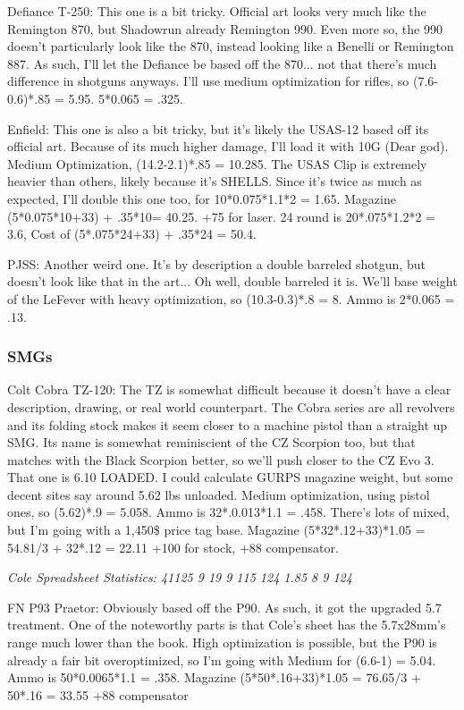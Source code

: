 \begin{multicols*}{2}
	Defiance T-250: This one is a bit tricky. Official art looks very much like the Remington 870, but Shadowrun already Remington 990. Even more so, the 990 doesn't particularly look like the 870, instead looking like a Benelli or Remington 887. As such, I'll let the Defiance be based off the 870... not that there's much difference in shotguns anyways. I'll use medium optimization for rifles, so (7.6-0.6)*.85 = 5.95. 5*0.065 = .325.
	
	Enfield: This one is also a bit tricky, but it's likely the USAS-12 based off its official art. Because of its much higher damage, I'll load it with 10G (Dear god). Medium Optimization, (14.2-2.1)*.85 = 10.285. The USAS Clip is extremely heavier than others, likely because it's SHELLS. Since it's twice as much as expected, I'll double this one too, for 10*0.075*1.1*2 = 1.65. Magazine (5*0.075*10+33) + .35*10= 40.25. +75 for laser. 24 round is 20*.075*1.2*2 = 3.6, Cost of (5*.075*24+33) + .35*24 = 50.4.
	
	PJSS: Another weird one. It's by description a double barreled shotgun, but doesn't look like that in the art... Oh well, double barreled it is. We'll base weight of the LeFever with heavy optimization, so (10.3-0.3)*.8 = 8. Ammo is  2*0.065 = .13.
	
	\subsubsection{SMGs}
	
	Colt Cobra TZ-120: The TZ is somewhat difficult because it doesn't have a clear description, drawing, or real world counterpart. The Cobra series are all revolvers and its folding stock makes it seem closer to a machine pistol than a straight up SMG. Its name is somewhat reminiscient of the CZ Scorpion too, but that matches with the Black Scorpion better, so we'll push closer to the CZ Evo 3. That one is 6.10 LOADED. I could calculate GURPS magazine weight, but some decent sites say around 5.62 lbs unloaded. Medium optimization, using pistol ones, so (5.62)*.9 = 5.058. Ammo is 32*.0.013*1.1 = .458. There's lots of mixed, but I'm going with a 1,450\$ price tag base. Magazine (5*32*.12+33)*1.05 = 54.81/3 + 32*.12 = 22.11 +100 for stock, +88 compensator.
	
	\textit{\textcolor{OliveGreen}{Cole Spreadsheet Statistics: 41125 9 19 9 115 124 1.85 8 9 124 }}
	
	FN P93 Praetor: Obviously based off the P90. As such, it got the upgraded 5.7 treatment. One of the noteworthy parts is that Cole's sheet has the 5.7x28mm's range much lower than the book. High optimization is possible, but the P90 is already a fair bit overoptimized, so I'm going with Medium for (6.6-1) = 5.04. Ammo is 50*0.0065*1.1 = .358. Magazine (5*50*.16+33)*1.05 = 76.65/3 + 50*.16 = 33.55 +88 compensator
	

\end{multicols*}
